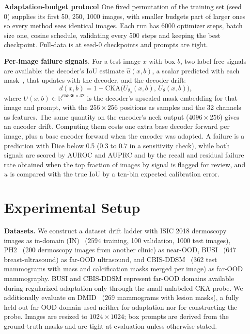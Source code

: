 \documentclass[runningheads]{llncs}
\begin{document}
\textbf{Adaptation-budget protocol} One fixed permutation of the training set (seed 0) supplies its first 50, 250, 1000 images, with smaller budgets part of larger ones so every method sees identical images. Each run has 6000 optimizer steps, batch size one, cosine schedule, validating every 500 steps and keeping the best checkpoint. Full-data is at seed-0 checkpoints and prompts are tight.

\textbf{Per-image failure signals.} For a test image $x$ with box $b$, two label-free signals are available: the decoder's IoU estimate $\hat{u}(x, b)$, a scalar predicted with each mask~\cite{kirillov2023sam}, that updates with the decoder, and the decoder drift:
\begin{equation}
  d(x, b) = 1 - \mathrm{CKA}\bigl(U_{\theta_0}(x, b),\, U_{\theta}(x, b)\bigr),
  \label{eq:drift}
\end{equation}
where $U(x,b) \in \mathbb{R}^{65536 \times 32}$ is the decoder's upscaled mask embedding for that image and prompt, with the $256 \times 256$ positions as samples and the 32 channels as features. The same quantity on the encoder's neck output ($4096 \times 256$) gives an encoder drift. Computing them costs one extra base decoder forward per image, plus a base encoder forward when the encoder was adapted. A failure is a prediction with Dice below 0.5 (0.3 to 0.7 in a sensitivity check), while both signals are scored by AUROC and AUPRC and by the recall and residual failure rate obtained when the top fraction of images by signal is flagged for review, and $\hat{u}$ is compared with the true IoU by a ten-bin expected calibration error.

\section{Experimental Setup}
\label{sec:setup}

\textbf{Datasets.} We construct a dataset drift ladder with ISIC 2018 dermoscopy images as in-domain (IN)~\cite{codella2019isic} (2594 training, 100 validation, 1000 test images), PH2~\cite{mendonca2013ph2} (200 dermoscopy images from another clinic) as near-OOD, BUSI~\cite{aldhabyani2020busi} (647 breast-ultrasound) as far-OOD ultrasound, and CBIS-DDSM~\cite{lee2017cbis} (362 test mammograms with mass and calcification masks merged per image) as far-OOD mammography. BUSI and CBIS-DDSM represent far-OOD domains available during regularized adaptation only through the small unlabeled CKA probe. We additionally evaluate on DMID~\cite{oza2024dmid} (269 mammograms with lesion masks), a fully held-out far-OOD domain used neither for adaptation nor for constructing the probe. Images are resized to $1024 \times 1024$; box prompts are derived from the ground-truth masks and are tight at evaluation unless otherwise stated.
\end{document}

